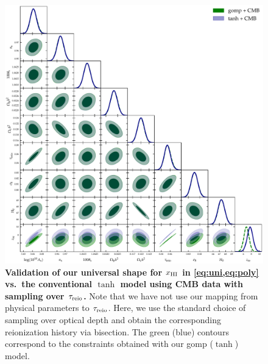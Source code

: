 \begin{figure}
\centering
\includegraphics[width=\linewidth]{figs/gomp_tanh_triangle_tau.pdf}
\caption{\textbf{Validation of our universal shape for $x_{\mathrm{HI}}$ in
\cref{eq:uni,eq:poly} vs.\ the conventional $\tanh$ model using CMB data
with sampling over $\tau_{\mathrm{reio}}$.}
Note that we have not use our mapping from physical parameters to
$\tau_{\mathrm{reio}}$.
Here, we use the standard choice of sampling over optical depth and
obtain the corresponding reionization history via bisection.
The green (blue) contours correspond to the constraints obtained with
our gomp ($\tanh$) model.}
\label{fig:tg}
\end{figure}

\FloatBarrier
